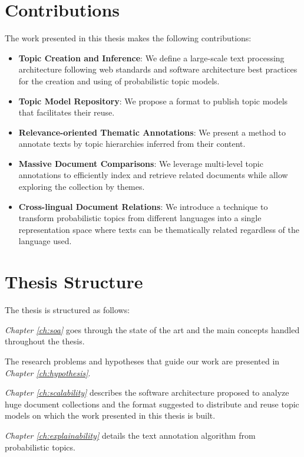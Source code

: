 \section{Contributions}

The work presented in this thesis makes the following contributions:

\begin{itemize}
\item \textbf{Topic Creation and Inference}: We define a large-scale text processing architecture following web standards and software architecture best practices for the creation and using of probabilistic topic models.
\item \textbf{Topic Model Repository}: We propose a format to publish topic models that facilitates their reuse.
\item \textbf{Relevance-oriented Thematic Annotations}: We present a method to annotate texts by topic hierarchies inferred from their content.
\item \textbf{Massive Document Comparisons}: We leverage multi-level topic annotations to efficiently index and retrieve related documents while allow exploring the collection by themes.
\item \textbf{Cross-lingual Document Relations}: We introduce a technique to transform probabilistic topics from different languages into a single representation space where texts can be thematically related regardless of the language used.
\end{itemize}

\section{Thesis Structure}

The thesis is structured as follows:

\textit{Chapter \ref{ch:soa}} goes through the state of the art and the main concepts handled throughout the thesis.

The research problems and hypotheses that guide our work are presented in \textit{Chapter \ref{ch:hypothesis}}.

\textit{Chapter \ref{ch:scalability}} describes the software architecture proposed to analyze huge document collections and the format suggested to distribute and reuse topic models on which the work presented in this thesis is built.

\textit{Chapter \ref{ch:explainability}} details the text annotation algorithm from probabilistic topics.

